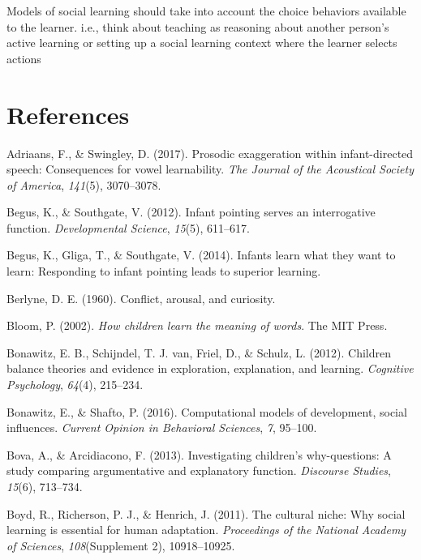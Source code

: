 \documentclass[a4paper,man,apacite,floatsintext]{apa6}
\begin{document}
Models of social learning should take into account the choice behaviors
available to the learner. i.e., think about teaching as reasoning about
another person's active learning or setting up a social learning context
where the learner selects actions

\newpage

\section{References}\label{references}

\setlength{\parindent}{-0.4in} \setlength{\leftskip}{0.125in} \noindent

\hypertarget{refs}{}
\hypertarget{ref-adriaans2017prosodic}{}
Adriaans, F., \& Swingley, D. (2017). Prosodic exaggeration within
infant-directed speech: Consequences for vowel learnability. \emph{The
Journal of the Acoustical Society of America}, \emph{141}(5),
3070--3078.

\hypertarget{ref-begus2012infant}{}
Begus, K., \& Southgate, V. (2012). Infant pointing serves an
interrogative function. \emph{Developmental Science}, \emph{15}(5),
611--617.

\hypertarget{ref-begus2014infants}{}
Begus, K., Gliga, T., \& Southgate, V. (2014). Infants learn what they
want to learn: Responding to infant pointing leads to superior learning.

\hypertarget{ref-berlyne1960conflict}{}
Berlyne, D. E. (1960). Conflict, arousal, and curiosity.

\hypertarget{ref-bloom2002children}{}
Bloom, P. (2002). \emph{How children learn the meaning of words}. The
MIT Press.

\hypertarget{ref-bonawitz2012children}{}
Bonawitz, E. B., Schijndel, T. J. van, Friel, D., \& Schulz, L. (2012).
Children balance theories and evidence in exploration, explanation, and
learning. \emph{Cognitive Psychology}, \emph{64}(4), 215--234.

\hypertarget{ref-bonawitz2016computational}{}
Bonawitz, E., \& Shafto, P. (2016). Computational models of development,
social influences. \emph{Current Opinion in Behavioral Sciences},
\emph{7}, 95--100.

\hypertarget{ref-bova2013investigating}{}
Bova, A., \& Arcidiacono, F. (2013). Investigating children's
why-questions: A study comparing argumentative and explanatory function.
\emph{Discourse Studies}, \emph{15}(6), 713--734.

\hypertarget{ref-boyd2011cultural}{}
Boyd, R., Richerson, P. J., \& Henrich, J. (2011). The cultural niche:
Why social learning is essential for human adaptation. \emph{Proceedings
of the National Academy of Sciences}, \emph{108}(Supplement 2),
10918--10925.
\end{document}

